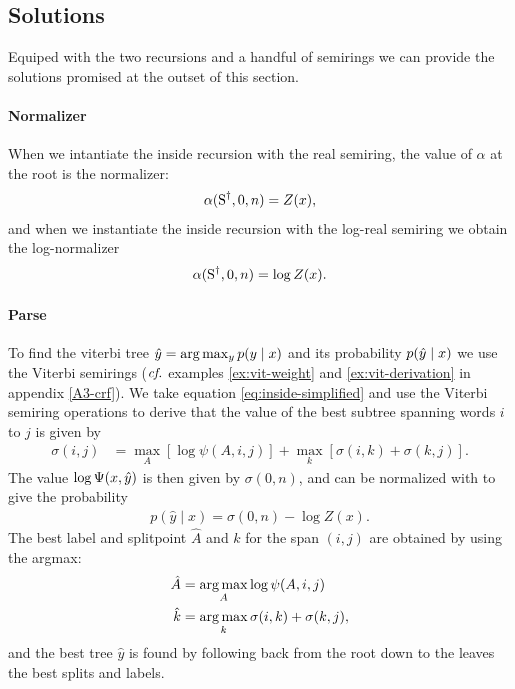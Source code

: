 \subsection{Solutions}
  Equiped with the two recursions and a handful of semirings we can provide the solutions promised at the outset of this section.

  \paragraph{Normalizer}
    When we intantiate the inside recursion with the real semiring, the value of $\alpha$ at the root is the normalizer:
    \begin{align*}
      \alpha(\text{S}^{\dagger}, 0, n) = Z(x),
    \end{align*}
    and when we instantiate the inside recursion with the log-real semiring we obtain the log-normalizer
    \begin{align*}
      \alpha(\text{S}^{\dagger}, 0, n) = \log Z(x).
    \end{align*}

  \paragraph{Parse}
    To find the viterbi tree $\hat{ y } = \arg \max_{ y } p(y  \mid x)$ and its probability $p(\hat{y} \mid x)$ we use the Viterbi semirings ($\emph{cf.}$ examples \ref{ex:vit-weight} and \ref{ex:vit-derivation} in appendix \ref{A3-crf}). We take equation \ref{eq:inside-simplified} and use the Viterbi semiring operations to derive that the value of the best subtree spanning words $i$ to $j$ is given by
    \begin{align}
      \label{eq:viterbi-score}
      \sigma(i,j)
        &= \max_{A} [ \log \psi(A, i, j) ] + \max_{k} [\sigma(i,k) + \sigma(k,j)].
    \end{align}
    The value $\log \Psi(x, \hat{y})$ is then given by $\sigma(0, n)$, and  can be normalized with to give the probability
    \begin{align}
      p(\hat{y} \mid x) = \sigma(0, n) - \log Z(x).
    \end{align}
    The best label and splitpoint $\hat{A}$ and $\hat{k}$ for the span $(i, j)$ are obtained by using the argmax:
    \begin{align}
      \label{eq:viterbi-tree}
      \hat{A} &= \operatorname*{arg\,max}_{ A  } \log \psi(A, i, j)  \\
      \hat{k} &= \operatorname*{arg\,max}_{ k } \sigma(i, k) + \sigma(k, j),
    \end{align}
    and the best tree $\hat{y}$ is found by following back from the root down to the leaves the best splits and labels.

